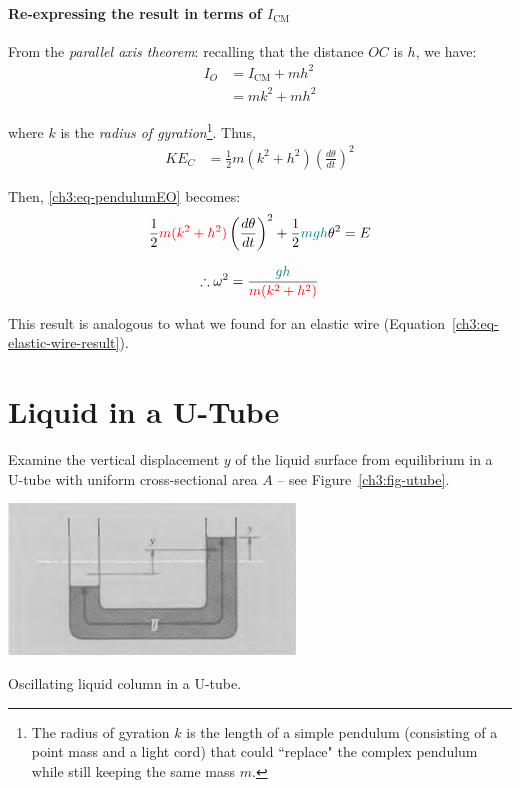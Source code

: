 \paragraph{Re-expressing the result in terms of $I_\text{CM}$}
From the \emph{parallel axis theorem}: recalling that the distance $OC$ is $h$, we have:
\begin{align*}
	I_O &= I_\text{CM} + mh^2 \\
	&= mk^2 + mh^2
\end{align*}

where $k$ is the \emph{radius of gyration}\footnote{The radius of gyration $k$ is the length of a simple pendulum (consisting of a point mass and a light cord) that could ``replace" the complex pendulum while still keeping the same mass $m$.}. Thus,
\begin{align*}
	KE_C %
	&= \frac{1}{2} m(k^2 + h^2 ) \left( \frac{d\theta}{dt} \right)^2
\end{align*}

Then, \eqref{ch3:eq-pendulumEO} becomes:
\[ \frac{1}{2} \textcolor{red}{m(k^2+h^2)} \left( \frac{d\theta}{dt} \right)^2  + \frac{1}{2} \textcolor{teal}{mgh}\theta^2 = E \]

\begin{equation*}
	\therefore \omega^2 = \frac{\textcolor{teal}{gh}}{\textcolor{red}{m(k^2+h^2)}}
\end{equation*}

This result is analogous to what we found for an elastic wire (Equation~\ref{ch3:eq-elastic-wire-result}).

\section{Liquid in a U-Tube} \label{ch3:sec-uTube}

Examine the vertical displacement $y$ of the liquid surface from equilibrium in a U-tube with uniform cross-sectional area $A$ -- see Figure~\ref{ch3:fig-utube}.

\begin{marginfigure}
	\centering
	\includegraphics[scale=0.6]{phys232/Ch3-utube.png}
	\caption{Oscillating liquid column in a U-tube.}
	\label{ch3:fig-utube}
\end{marginfigure}

